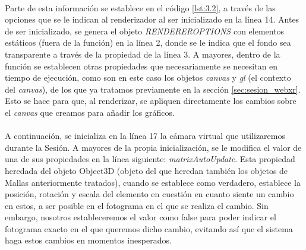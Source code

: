 \documentclass{subfiles}
\begin{document}
        \paragraph{}
        Parte de esta información se establece en el código \ref{lst:3.2}, a través de las opciones que se le indican al renderizador al ser inicializado en la línea 14. Antes de ser inicializado, se genera el objeto \textit{RENDEREROPTIONS} con elementos estáticos (fuera de la función) en la línea 2, donde se le indica que el fondo sea transparente a través de la propiedad de la línea 3. A mayores, dentro de la función se establecen otras propiedades que necesariamente se necesitan en tiempo de ejecución, como son en este caso los objetos \textit{canvas} y \textit{gl} (el contexto del \textit{canvas}), de los que ya tratamos previamente en la sección \ref{sec:sesion_webxr}. Esto se hace para que, al renderizar, se apliquen directamente los cambios sobre el \textit{canvas} que creamos para añadir los gráficos.

        \paragraph{}
        A continuación, se inicializa en la línea 17 la cámara virtual que utilizaremos durante la Sesión. A mayores de la propia inicialización, se le modifica el valor de una de sus propiedades en la línea siguiente: \textit{matrixAutoUpdate}. Esta propiedad heredada del objeto Object3D (objeto del que heredan también los objetos de Mallas anteriormente tratados), cuando se establece como verdadero, establece la posición, rotación y escala del elemento en cuestión en cuanto siente un cambio en estos, a ser posible en el fotograma en el que se realiza el cambio. Sin embargo, nosotros estableceremos el valor como false para poder indicar el fotograma exacto en el que queremos dicho cambio, evitando así que el sistema haga estos cambios en momentos inesperados.
        
\end{document}
